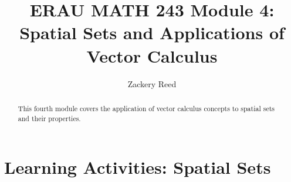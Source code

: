 \documentclass{xourse}
\title{ERAU MATH 243 Module 4: Spatial Sets and Applications of Vector Calculus}
\author{Zackery Reed}
\begin{document}
\begin{abstract}
This fourth module covers the application of vector calculus concepts to spatial sets and their properties.
\end{abstract}
\maketitle

\part{Learning Activities: Spatial Sets}
\sectionstyle


\end{document}
